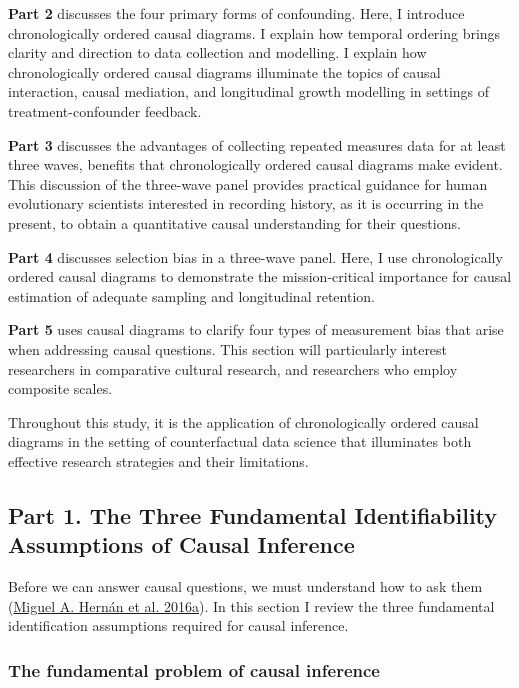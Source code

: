 \documentclass[
  singlecolumn]{article}
\begin{document}
\textbf{Part 2} discusses the four primary forms of confounding. Here, I
introduce chronologically ordered causal diagrams. I explain how
temporal ordering brings clarity and direction to data collection and
modelling. I explain how chronologically ordered causal diagrams
illuminate the topics of causal interaction, causal mediation, and
longitudinal growth modelling in settings of treatment-confounder
feedback.

\textbf{Part 3} discusses the advantages of collecting repeated measures
data for at least three waves, benefits that chronologically ordered
causal diagrams make evident. This discussion of the three-wave panel
provides practical guidance for human evolutionary scientists interested
in recording history, as it is occurring in the present, to obtain a
quantitative causal understanding for their questions.

\textbf{Part 4} discusses selection bias in a three-wave panel. Here, I
use chronologically ordered causal diagrams to demonstrate the
mission-critical importance for causal estimation of adequate sampling
and longitudinal retention.

\textbf{Part 5} uses causal diagrams to clarify four types of
measurement bias that arise when addressing causal questions. This
section will particularly interest researchers in comparative cultural
research, and researchers who employ composite scales.

Throughout this study, it is the application of chronologically ordered
causal diagrams in the setting of counterfactual data science that
illuminates both effective research strategies and their limitations.

\hypertarget{part-1.-the-three-fundamental-identifiability-assumptions-of-causal-inference}{%
\subsection{Part 1. The Three Fundamental Identifiability Assumptions of
Causal
Inference}\label{part-1.-the-three-fundamental-identifiability-assumptions-of-causal-inference}}

Before we can answer causal questions, we must understand how to ask
them (\protect\hyperlink{ref-hernuxe1n2016}{Miguel A. Hernán et al.
2016a}). In this section I review the three fundamental identification
assumptions required for causal inference.

\hypertarget{the-fundamental-problem-of-causal-inference}{%
\subsubsection{The fundamental problem of causal
inference}\label{the-fundamental-problem-of-causal-inference}}
\end{document}
